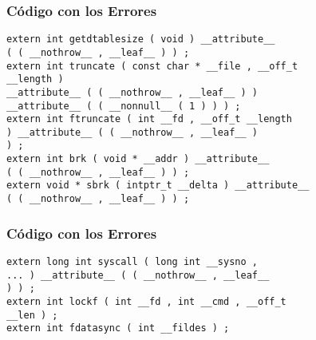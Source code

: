 \documentclass{beamer}
\begin{document}
\begin{frame}[fragile]
\frametitle{C\'odigo con los Errores}
\begin{verbatim}
extern int getdtablesize ( void ) __attribute__ 
( ( __nothrow__ , __leaf__ ) ) ; 
extern int truncate ( const char * __file , __off_t 
__length ) 
__attribute__ ( ( __nothrow__ , __leaf__ ) ) 
__attribute__ ( ( __nonnull__ ( 1 ) ) ) ; 
extern int ftruncate ( int __fd , __off_t __length 
) __attribute__ ( ( __nothrow__ , __leaf__ ) 
) ; 
extern int brk ( void * __addr ) __attribute__ 
( ( __nothrow__ , __leaf__ ) ) ; 
extern void * sbrk ( intptr_t __delta ) __attribute__ 
( ( __nothrow__ , __leaf__ ) ) ; 
\end{verbatim}
\end{frame}
\begin{frame}[fragile]
\frametitle{C\'odigo con los Errores}
\begin{verbatim}
extern long int syscall ( long int __sysno , 
... ) __attribute__ ( ( __nothrow__ , __leaf__ 
) ) ; 
extern int lockf ( int __fd , int __cmd , __off_t 
__len ) ; 
extern int fdatasync ( int __fildes ) ; \end{verbatim}
\end{frame}
\end{document}
